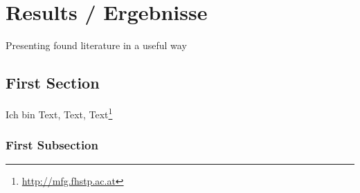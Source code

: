 \chapter{Results / Ergebnisse}
\label{ch:results}

Presenting found literature in a useful way

\section{First Section}
Ich bin Text, Text, Text\footnote{\url{http://mfg.fhstp.ac.at}}


\subsection{First Subsection}